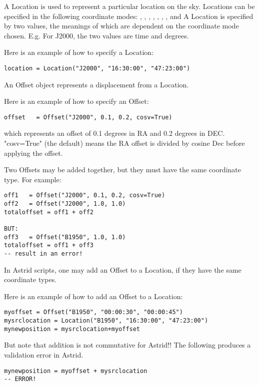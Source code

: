 \label{appendix:locations}

A Location is used to represent a particular location on the sky. Locations 
can be specified in the following coordinate modes: , , 
, , , , , and  
A Location is specified by two values, the meanings of which are dependent on 
the coordinate mode chosen. E.g. For J2000, the two values are time and 
degrees. 

Here is an example of 
how to specify a Location:
\begin{verbatim}
location = Location("J2000", "16:30:00", "47:23:00")
\end{verbatim}

An Offset object represents a displacement from a Location.

Here is an example of 
how to specify an Offset:
\begin{verbatim}
offset   = Offset("J2000", 0.1, 0.2, cosv=True)
\end{verbatim}
which represents an offset of 0.1 degrees in RA and 0.2 degrees in DEC.
"cosv=True" (the default)  means the RA offset is divided by cosine Dec before
applying the offset.

Two Offsets may be added together, but they must have the same coordinate type.
For example:
\begin{verbatim}
off1   = Offset("J2000", 0.1, 0.2, cosv=True)
off2   = Offset("J2000", 1.0, 1.0)
totaloffset = off1 + off2

BUT:
off3   = Offset("B1950", 1.0, 1.0)
totaloffset = off1 + off3
-- result in an error!
\end{verbatim}


In Astrid scripts, one may add an Offset to a Location, if they have the same coordinate types.

Here is an example of 
how to add an Offset to a Location:
\begin{verbatim}
myoffset = Offset("B1950", "00:00:30", "00:00:45")
mysrclocation = Location("B1950", "16:30:00", "47:23:00")
mynewposition = mysrclocation+myoffset
\end{verbatim}

But note that addition is not commutative for Astrid!!
The following produces a validation error in Astrid.
\begin{verbatim}
mynewposition = myoffset + mysrclocation 
-- ERROR!
\end{verbatim}

\newpage
